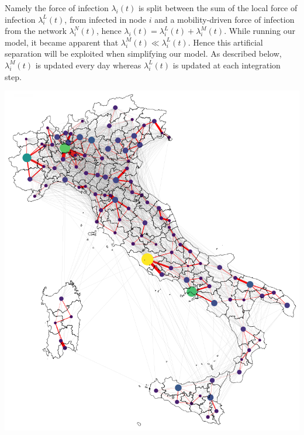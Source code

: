Namely the force of infection $\lambda_i(t)$ is split between the sum of the local force of infection $\lambda^L_i(t)$, from infected in node $i$ and a mobility-driven force of infection from the network $\lambda^N_i(t)$, hence $\lambda_i(t) = \lambda^L_i(t) + \lambda^M_i(t)$. While running our model, it became apparent that $\lambda^M_i(t) \ll \lambda^L_i(t)$. Hence this artificial separation will be exploited when simplifying our model. As described below, $\lambda^M_i(t)$ is updated every day whereas $\lambda^L_i(t)$ is updated at each integration step.
\begin{marginfigure}
\centering
\includegraphics{fig_italy-ocp/figures/map_nd.png}
    \label{fig:model_description_network}
\end{marginfigure}

